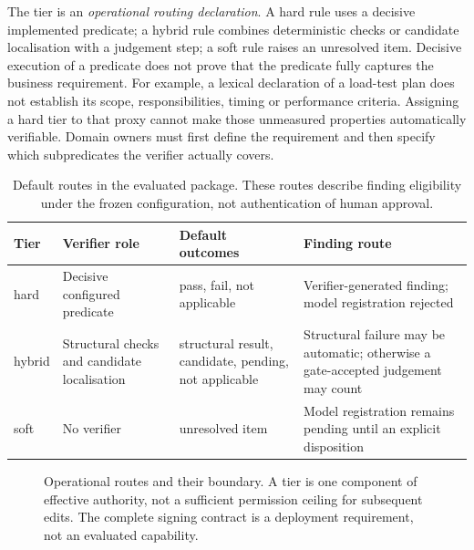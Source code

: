 \documentclass[computers,article,submit,moreauthors]{Definitions/mdpi}
\begin{document}
The tier is an \emph{operational routing declaration}. A hard rule uses a decisive implemented predicate; a hybrid rule combines deterministic checks or candidate localisation with a judgement step; a soft rule raises an unresolved item. Decisive execution of a predicate does not prove that the predicate fully captures the business requirement. For example, a lexical declaration of a load-test plan does not establish its scope, responsibilities, timing or performance criteria. Assigning a hard tier to that proxy cannot make those unmeasured properties automatically verifiable. Domain owners must first define the requirement and then specify which subpredicates the verifier actually covers.

\begin{table}[!ht]
\caption{Default routes in the evaluated package. These routes describe finding eligibility under the frozen configuration, not authentication of human approval.}
\label{tab:tiers}
\centering\small
\begin{tabularx}{\textwidth}{@{}lXXX@{}}
\toprule
Tier & Verifier role & Default outcomes & Finding route \\
\midrule
hard & Decisive configured predicate & pass, fail, not applicable & Verifier-generated finding; model registration rejected \\
 hybrid & Structural checks and candidate localisation & structural result, candidate, pending, not applicable & Structural failure may be automatic; otherwise a gate-accepted judgement may count \\
soft & No verifier & unresolved item & Model registration remains pending until an explicit disposition \\
\bottomrule
\end{tabularx}
\end{table}

\begin{figure}[!ht]
\centering
{}
\caption{Operational routes and their boundary. A tier is one component of effective authority, not a sufficient permission ceiling for subsequent edits. The complete signing contract is a deployment requirement, not an evaluated capability.}
\label{fig:type}
\end{figure}
\end{document}
